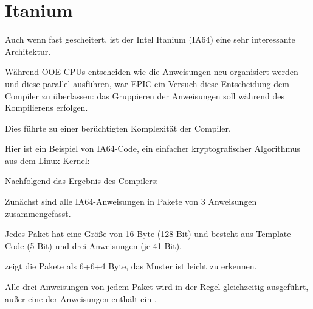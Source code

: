 \section{Itanium}
\label{itanium}

Auch wenn fast gescheitert, ist der Intel Itanium (\ac{IA64}) eine sehr interessante
Architektur.

Während \ac{OOE}-CPUs entscheiden wie die Anweisungen neu organisiert werden und
diese parallel ausführen, war \ac{EPIC} ein Versuch diese Entscheidung dem Compiler
zu überlassen: das Gruppieren der Anweisungen soll während des Kompilierens erfolgen.

Dies führte zu einer berüchtigten Komplexität der Compiler.

Hier ist ein Beispiel von \ac{IA64}-Code, ein einfacher kryptografischer Algorithmus
aus dem Linux-Kernel:



Nachfolgend das Ergebnis des Compilers:



Zunächst sind alle \ac{IA64}-Anweisungen in Pakete von 3 Anweisungen zusammengefasst.

Jedes Paket hat eine Größe von 16 Byte (128 Bit) und besteht aus Template-Code
(5 Bit) und drei Anweisungen (je 41 Bit).

\IDA zeigt die Pakete als 6+6+4 Byte, das Muster ist leicht zu erkennen.

Alle drei Anweisungen von jedem Paket wird in der Regel gleichzeitig ausgeführt,
außer eine der Anweisungen enthält ein .

